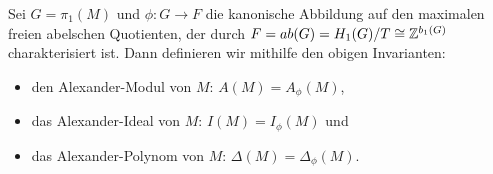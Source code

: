        \begin{defn}
            Sei $G=\pi_1(M)$ und $\phi:G \to F$ die kanonische Abbildung auf den maximalen freien abelschen Quotienten, der durch $ F = ab(G) = H_1(G)/T \cong \mathbb{Z}^{b_1(G)}$ charakterisiert ist. Dann definieren wir mithilfe den obigen Invarianten:
            \begin{itemize}
                \item den Alexander-Modul von $M$: $A(M)=A_\phi(M)$,
                \item das Alexander-Ideal von $M$: $I(M)=I_\phi(M)$ und
                \item das Alexander-Polynom von $M$: $\Delta(M)=\Delta_\phi(M)$.
            \end{itemize}
        \end{defn}


